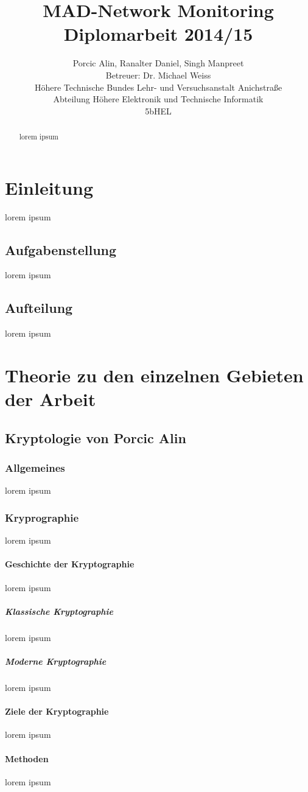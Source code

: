 \documentclass[10pt,a4paper]{report}
\title{MAD-Network Monitoring\\
Diplomarbeit 2014/15}
\author{Porcic Alin, Ranalter Daniel, Singh Manpreet\\
Betreuer: Dr. Michael Weiss\\
Höhere Technische Bundes Lehr- und Versuchsanstalt Anichstraße\\
Abteilung Höhere Elektronik und Technische Informatik\\
5bHEL}
\begin{document}
\maketitle
\begin{abstract}
lorem ipsum 
\end{abstract}
\setcounter{tocdepth}{6}
\tableofcontents
\newpage
\chapter{Einleitung}
lorem ipsum
\section{Aufgabenstellung}
lorem ipsum
\section{Aufteilung}
lorem ipsum 
\chapter{Theorie zu den einzelnen Gebieten der Arbeit}
\section{Kryptologie von Porcic Alin}
\subsection{Allgemeines}
lorem ipsum
\subsection{Kryprographie}
lorem ipsum
\subsubsection{Geschichte der Kryptographie}
lorem ipsum
\paragraph{Klassische Kryptographie}
lorem ipsum
\paragraph{Moderne Kryptographie}
lorem ipsum
\subsubsection{Ziele der Kryptographie}
lorem ipsum
\subsubsection{Methoden}
lorem ipsum
\end{document}

